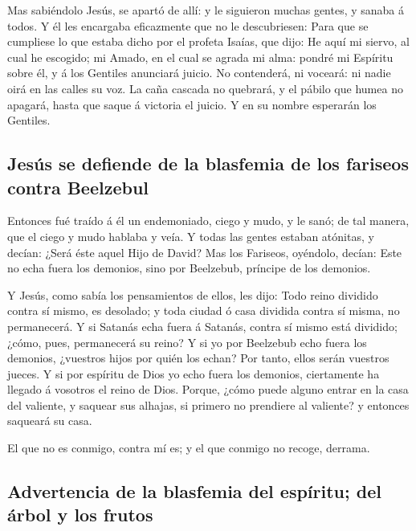  Mas sabiéndolo Jesús, se apartó de allí: y le siguieron
muchas gentes, y sanaba á todos.  Y él les encargaba
eficazmente que no le descubriesen:  Para que se cumpliese
lo que estaba dicho por el profeta Isaías, que dijo:  He
aquí mi siervo, al cual he escogido; mi Amado, en el cual se agrada mi
alma: pondré mi Espíritu sobre él, y á los Gentiles anunciará juicio.
 No contenderá, ni voceará: ni nadie oirá en las calles su
voz.  La caña cascada no quebrará, y el pábilo que humea no
apagará, hasta que saque á victoria el juicio.  Y en su
nombre esperarán los Gentiles.

\hypertarget{jesuxfas-se-defiende-de-la-blasfemia-de-los-fariseos-contra-beelzebul}{%
\subsection{Jesús se defiende de la blasfemia de los fariseos contra
Beelzebul}\label{jesuxfas-se-defiende-de-la-blasfemia-de-los-fariseos-contra-beelzebul}}

 Entonces fué traído á él un endemoniado, ciego y mudo, y
le sanó; de tal manera, que el ciego y mudo hablaba y veía.
 Y todas las gentes estaban atónitas, y decían: ¿Será éste
aquel Hijo de David?  Mas los Fariseos, oyéndolo, decían:
Este no echa fuera los demonios, sino por Beelzebub, príncipe de los
demonios.

 Y Jesús, como sabía los pensamientos de ellos, les dijo:
Todo reino dividido contra sí mismo, es desolado; y toda ciudad ó casa
dividida contra sí misma, no permanecerá.  Y si Satanás
echa fuera á Satanás, contra sí mismo está dividido; ¿cómo, pues,
permanecerá su reino?  Y si yo por Beelzebub echo fuera los
demonios, ¿vuestros hijos por quién los echan? Por tanto, ellos serán
vuestros jueces.  Y si por espíritu de Dios yo echo fuera
los demonios, ciertamente ha llegado á vosotros el reino de Dios.
 Porque, ¿cómo puede alguno entrar en la casa del valiente,
y saquear sus alhajas, si primero no prendiere al valiente? y entonces
saqueará su casa.

 El que no es conmigo, contra mí es; y el que conmigo no
recoge, derrama.

\hypertarget{advertencia-de-la-blasfemia-del-espuxedritu-del-uxe1rbol-y-los-frutos}{%
\subsection{Advertencia de la blasfemia del espíritu; del árbol y los
frutos}\label{advertencia-de-la-blasfemia-del-espuxedritu-del-uxe1rbol-y-los-frutos}}

